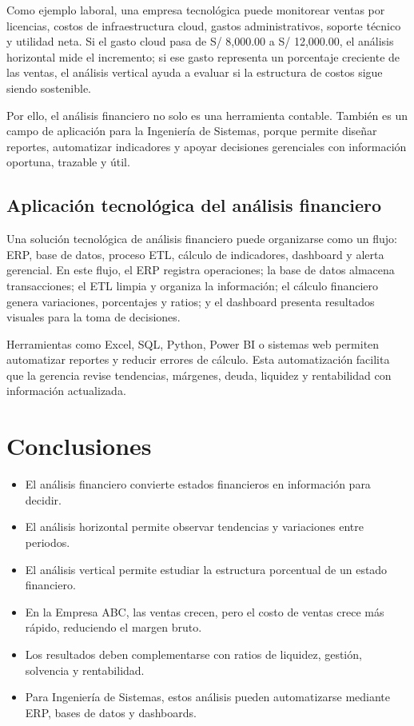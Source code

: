Como ejemplo laboral, una empresa tecnológica puede monitorear ventas por licencias, costos de infraestructura cloud, gastos administrativos, soporte técnico y utilidad neta. Si el gasto cloud pasa de S/ 8,000.00 a S/ 12,000.00, el análisis horizontal mide el incremento; si ese gasto representa un porcentaje creciente de las ventas, el análisis vertical ayuda a evaluar si la estructura de costos sigue siendo sostenible.

Por ello, el análisis financiero no solo es una herramienta contable. También es un campo de aplicación para la Ingeniería de Sistemas, porque permite diseñar reportes, automatizar indicadores y apoyar decisiones gerenciales con información oportuna, trazable y útil.

\subsection{Aplicación tecnológica del análisis financiero}

Una solución tecnológica de análisis financiero puede organizarse como un flujo: ERP, base de datos, proceso ETL, cálculo de indicadores, dashboard y alerta gerencial. En este flujo, el ERP registra operaciones; la base de datos almacena transacciones; el ETL limpia y organiza la información; el cálculo financiero genera variaciones, porcentajes y ratios; y el dashboard presenta resultados visuales para la toma de decisiones.

Herramientas como Excel, SQL, Python, Power BI o sistemas web permiten automatizar reportes y reducir errores de cálculo. Esta automatización facilita que la gerencia revise tendencias, márgenes, deuda, liquidez y rentabilidad con información actualizada.

\section{Conclusiones}

\begin{itemize}
  \item El análisis financiero convierte estados financieros en información para decidir.
  \item El análisis horizontal permite observar tendencias y variaciones entre periodos.
  \item El análisis vertical permite estudiar la estructura porcentual de un estado financiero.
  \item En la Empresa ABC, las ventas crecen, pero el costo de ventas crece más rápido, reduciendo el margen bruto.
  \item Los resultados deben complementarse con ratios de liquidez, gestión, solvencia y rentabilidad.
  \item Para Ingeniería de Sistemas, estos análisis pueden automatizarse mediante ERP, bases de datos y dashboards.
\end{itemize}
